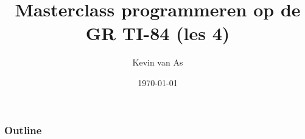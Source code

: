 \documentclass{beamer}
\title{Masterclass programmeren op de GR TI-84 (les 4)}
\author{Kevin van As}
\date{\today}
\begin{document}
\begin{frame}
\titlepage
\end{frame}



\begin{frame}
\frametitle{Outline}
\tableofcontents
\end{frame}




% 


% 
% 
%
%
%
%
% 
%
%
% 
%
\end{document}
